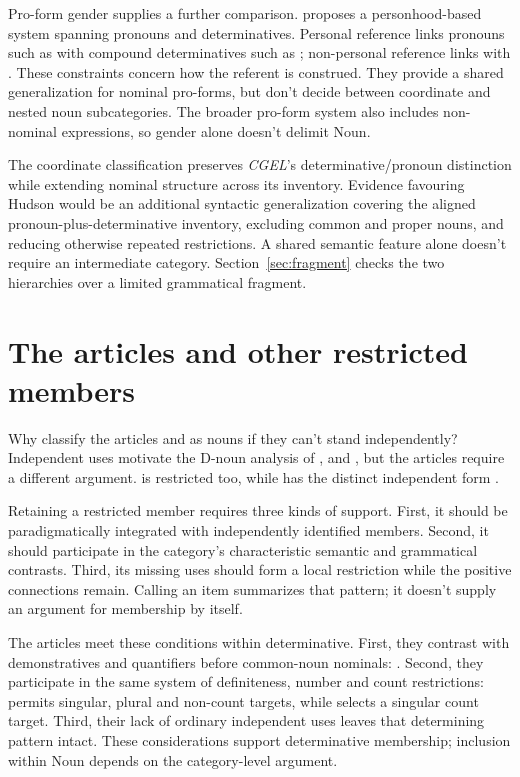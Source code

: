 \documentclass[12pt]{article}
\begin{document}
Pro-form gender supplies a further comparison. \textcite{reynolds2025proformgender} proposes a personhood-based system spanning pronouns and determinatives. Personal reference links pronouns such as  with compound determinatives such as ; non-personal reference links  with . These constraints concern how the referent is construed. They provide a shared generalization for nominal pro-forms, but don't decide between coordinate and nested noun subcategories. The broader pro-form system also includes non-nominal expressions, so gender alone doesn't delimit Noun.

The coordinate classification preserves \textit{CGEL}'s determinative/pronoun distinction while extending nominal structure across its inventory. Evidence favouring Hudson would be an additional syntactic generalization covering the aligned pronoun-plus-determinative inventory, excluding common and proper nouns, and reducing otherwise repeated restrictions. A shared semantic feature alone doesn't require an intermediate category. Section~\ref{sec:fragment} checks the two hierarchies over a limited grammatical fragment.

\section{The articles and other restricted members}\label{sec:articles}

Why classify the articles  and  as nouns if they can't stand independently? Independent uses motivate the D-noun analysis of ,  and , but the articles require a different argument.  is restricted too, while  has the distinct independent form  \citep[371--372, 410--411]{huddleston2002}.

Retaining a restricted member requires three kinds of support. First, it should be paradigmatically integrated with independently identified members. Second, it should participate in the category's characteristic semantic and grammatical contrasts. Third, its missing uses should form a local restriction while the positive connections remain. Calling an item  summarizes that pattern; it doesn't supply an argument for membership by itself.

The articles meet these conditions within determinative. First, they contrast with demonstratives and quantifiers before common-noun nominals: . Second, they participate in the same system of definiteness, number and count restrictions:  permits singular, plural and non-count targets, while  selects a singular count target. Third, their lack of ordinary independent uses leaves that determining pattern intact. These considerations support determinative membership; inclusion within Noun depends on the category-level argument.
\end{document}
